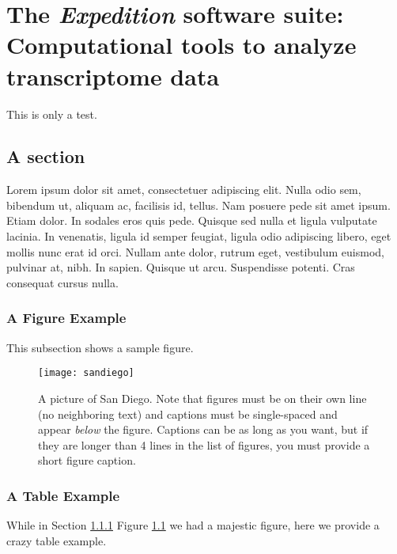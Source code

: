 \chapter{The \emph{Expedition} software suite: Computational tools to analyze transcriptome data}
This is only a test.
\section{A section}
Lorem ipsum dolor sit amet, consectetuer adipiscing elit. Nulla odio
sem, bibendum ut, aliquam ac, facilisis id, tellus. Nam posuere pede
sit amet ipsum. Etiam dolor. In sodales eros quis pede.  Quisque sed
nulla et ligula vulputate lacinia. In venenatis, ligula id semper
feugiat, ligula odio adipiscing libero, eget mollis nunc erat id orci.
Nullam ante dolor, rutrum eget, vestibulum euismod, pulvinar at, nibh.
In sapien. Quisque ut arcu. Suspendisse potenti. Cras consequat cursus
nulla.

\subsection{A Figure Example}
\label{ssec:figure_example}

This subsection shows a sample figure.

\begin{figure}[h] 
  \centering
  \texttt{[image: sandiego]}
  \caption[Short figure caption (must be  lines in the list of figures)]{A picture of San Diego.  Note that figures must be on their own line (no neighboring text) and captions must be single-spaced and appear \protect\textit{below} the figure.  Captions can be as long as you want, but if they are longer than 4 lines in the list of figures, you must provide a short figure caption.} 
  \label{fig:sandiego}
\end{figure}

\subsection{A Table Example}

While in Section \ref{ssec:figure_example} Figure \ref{fig:sandiego} we had a majestic figure, here we provide a crazy table example.


